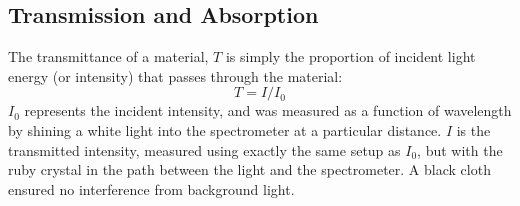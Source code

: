 \documentclass[11pt, a4paper, twocolumn]{article}
\begin{document}
\subsection*{Transmission and Absorption}

The transmittance of a material, $T$ is simply the proportion of incident light energy (or intensity) that passes through the material:
\setlength{\abovedisplayskip}{8pt}
\setlength{\belowdisplayskip}{8pt}
$$T=I/I_0$$
$I_0$ represents the incident intensity, and was measured as a function of wavelength by shining a white light into the spectrometer at a particular distance. $I$ is the transmitted intensity, measured using exactly the same setup as $I_0$, but with the ruby crystal in the path between the light and the spectrometer. A black cloth ensured no interference from background light.
\end{document}
